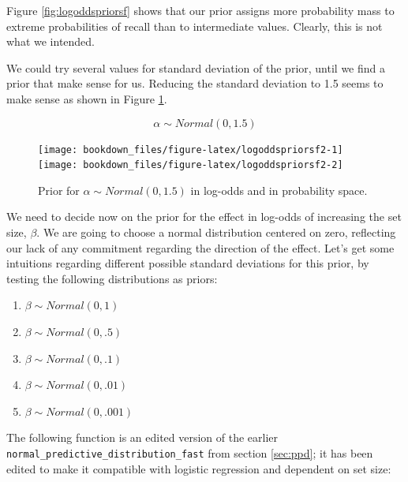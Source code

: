 \documentclass[12pt,]{krantz}
\providecommand{\tightlist}{%
  \setlength{\itemsep}{0pt}\setlength{\parskip}{0pt}}
\theoremstyle{definition}
\theoremstyle{definition}
\theoremstyle{definition}
\theoremstyle{remark}
\begin{document}
Figure \ref{fig:logoddspriorsf} shows that our prior assigns more probability mass to extreme probabilities of recall than to intermediate values. Clearly, this is not what we intended.

We could try several values for standard deviation of the prior, until we find a prior that make sense for us. Reducing the standard deviation to 1.5 seems to make sense as shown in Figure \ref{fig:logoddspriorsf2}.

\begin{equation}
\alpha \sim Normal(0, 1.5) 
\end{equation}



\begin{figure}
\texttt{[image: bookdown\_files/figure-latex/logoddspriorsf2-1]} \texttt{[image: bookdown\_files/figure-latex/logoddspriorsf2-2]} \caption{Prior for \(\alpha \sim Normal(0, 1.5)\) in log-odds and in probability space.}\label{fig:logoddspriorsf2}
\end{figure}

We need to decide now on the prior for the effect in log-odds of increasing the set size, \(\beta\). We are going to choose a normal distribution centered on zero, reflecting our lack of any commitment regarding the direction of the effect. Let's get some intuitions regarding different possible standard deviations for this prior, by testing the following distributions as priors:

\begin{enumerate}
\def\labelenumi{(\alph{enumi})}
\tightlist
\item
  \(\beta \sim Normal(0, 1)\)
\item
  \(\beta \sim Normal(0, .5)\)
\item
  \(\beta \sim Normal(0, .1)\)
\item
  \(\beta \sim Normal(0, .01)\)
\item
  \(\beta \sim Normal(0, .001)\)
\end{enumerate}

The following function is an edited version of the earlier \texttt{normal\_predictive\_distribution\_fast} from section \ref{sec:ppd}; it has been edited to make it compatible with logistic regression and dependent on set size:
\end{document}
